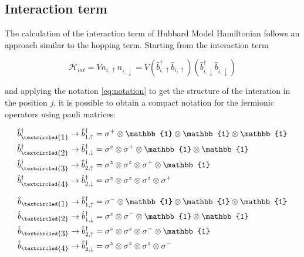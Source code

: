 \documentclass[twoside,twocolumn]{article}
\begin{document}

\subsection{Interaction term}

The calculation of the interaction term of Hubbard Model Hamiltonian follows an approach similar to the hopping term.
Starting from the interaction term

\begin{equation}\label{eq:interaction_term}
\mathcal{H}_{int} = V{n_{i,\uparrow} n_{i,\downarrow}} = V(\hat{b}^\dagger_{i,\uparrow}\hat{b}_{i,\uparrow})(\hat{b}^\dagger_{i,\downarrow}\hat{b}_{i,\downarrow})
\end{equation}

and applying the notation \ref{eq:notation}
to get the structure of the interation in the position $j$,
it is possible to obtain a compact notation for the fermionic operators using pauli matrices:

\begin{equation}\label{eq:b+_chain}
\begin{aligned}
\hat{b}^\dagger_{\textcircled{\raisebox{-0.9pt}{1}}} \rightarrow \hat{b}^\dagger_{1,\uparrow} &=
  \sigma^+ \otimes \mathbb{1} \otimes \mathbb{1} \otimes \mathbb{1} \\
\hat{b}^\dagger_{\textcircled{\raisebox{-0.9pt}{2}}} \rightarrow \hat{b}^\dagger_{1,\downarrow} &=
  \sigma^z \otimes \sigma^+ \otimes \mathbb{1} \otimes \mathbb{1} \\
\hat{b}^\dagger_{\textcircled{\raisebox{-0.9pt}{3}}} \rightarrow \hat{b}^\dagger_{2,\uparrow} &=
  \sigma^z \otimes \sigma^z \otimes \sigma^+ \otimes \mathbb{1} \\
\hat{b}^\dagger_{\textcircled{\raisebox{-0.9pt}{4}}} \rightarrow \hat{b}^\dagger_{2,\downarrow} &=
  \sigma^z \otimes \sigma^z \otimes \sigma^z \otimes \sigma^+ \\
\end{aligned}
\end{equation}

\begin{equation}\label{eq:b_chain}
\begin{aligned}
\hat{b}_{\textcircled{\raisebox{-0.9pt}{1}}} \rightarrow \hat{b}^\dagger_{1,\uparrow} &=
  \sigma^- \otimes \mathbb{1} \otimes \mathbb{1} \otimes \mathbb{1} \\
\hat{b}_{\textcircled{\raisebox{-0.9pt}{2}}} \rightarrow \hat{b}^\dagger_{1,\downarrow} &=
  \sigma^z \otimes \sigma^- \otimes \mathbb{1} \otimes \mathbb{1} \\
\hat{b}_{\textcircled{\raisebox{-0.9pt}{3}}} \rightarrow \hat{b}^\dagger_{2,\uparrow} &=
  \sigma^z \otimes \sigma^z \otimes \sigma^- \otimes \mathbb{1} \\
\hat{b}_{\textcircled{\raisebox{-0.9pt}{4}}} \rightarrow \hat{b}^\dagger_{2,\downarrow} &=
  \sigma^z \otimes \sigma^z \otimes \sigma^z \otimes \sigma^- \\
\end{aligned}
\end{equation}
\end{document}
